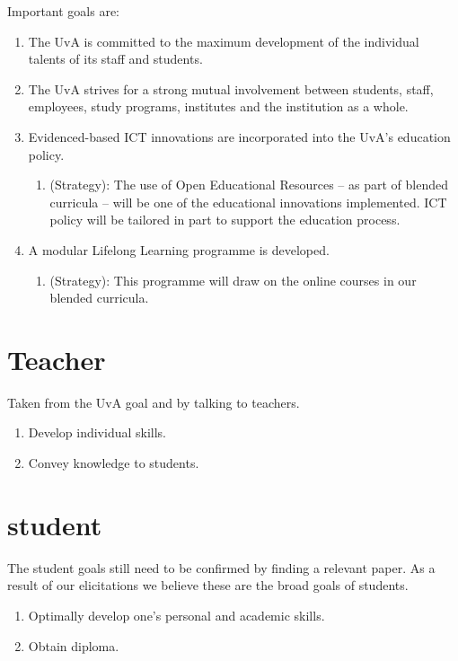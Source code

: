 Important goals are:
\begin{enumerate}
	\item The UvA is committed to the maximum development of the individual talents of its staff and students.\cite{uva_mission}
	\item The UvA strives for a strong mutual involvement between students, staff, employees, study programs, institutes and the institution as a whole.\cite{uva_mission}
	\item Evidenced-based ICT innovations are incorporated into the UvA’s education policy.\cite{uva_strategic_plan} \begin{enumerate}
		\item (Strategy): The use of Open Educational Resources – as part of blended curricula – will be one of the educational innovations implemented. ICT policy will be tailored in part to support the education process. 
	\end{enumerate}
	\item A modular Lifelong Learning programme is developed.\cite{uva_strategic_plan} \begin{enumerate}
		\item (Strategy): This programme will draw on the online
		courses in our blended curricula. 
	\end{enumerate}
\end{enumerate}

\section{Teacher}
Taken from the UvA goal and by talking to teachers.
\begin{enumerate}
	\item Develop individual skills.
	\item Convey knowledge to students.
\end{enumerate}

\section{student}
The student goals still need to be confirmed by finding a relevant paper. As a result of our elicitations we believe these are the broad goals of students.
\begin{enumerate}
	\item Optimally develop one's personal and academic skills.	
	\item Obtain diploma.
\end{enumerate}

